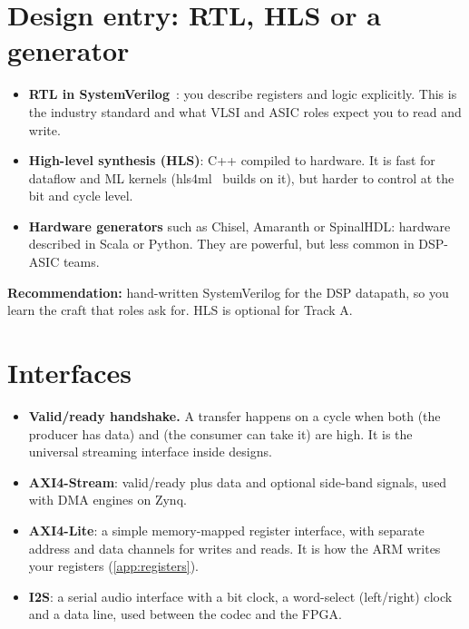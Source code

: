 \section{Design entry: RTL, HLS or a generator}\label{sec:primer:entry}

\begin{itemize}
  \item \textbf{RTL in SystemVerilog}~\cite{sutherland2006svdesign}: you
        describe registers and logic explicitly. This is the industry standard
        and what VLSI and ASIC roles expect you to read and write.
  \item \textbf{High-level synthesis (HLS)}: C++ compiled to hardware. It is
        fast for dataflow and ML kernels (hls4ml~\cite{duarte2018hls4ml} builds
        on it), but harder to control at the bit and cycle level.
  \item \textbf{Hardware generators} such as Chisel, Amaranth or SpinalHDL:
        hardware described in Scala or Python. They are powerful, but less
        common in DSP-ASIC teams.
\end{itemize}

\textbf{Recommendation:} hand-written SystemVerilog for the DSP datapath, so
you learn the craft that roles ask for. HLS is optional for Track A.

\section{Interfaces}\label{sec:primer:interfaces}

\begin{itemize}
  \item \textbf{Valid/ready handshake.} A transfer happens on a cycle when both
         (the producer has data) and  (the consumer can
        take it) are high. It is the universal streaming interface inside
        designs.
  \item \textbf{AXI4-Stream}: valid/ready plus data and optional side-band
        signals, used with DMA engines on Zynq.
  \item \textbf{AXI4-Lite}: a simple memory-mapped register interface, with
        separate address and data channels for writes and reads. It is how the
        ARM writes your registers (\cref{app:registers}).
  \item \textbf{I2S}: a serial audio interface with a bit clock, a word-select
        (left/right) clock and a data line, used between the codec and the FPGA.
\end{itemize}

